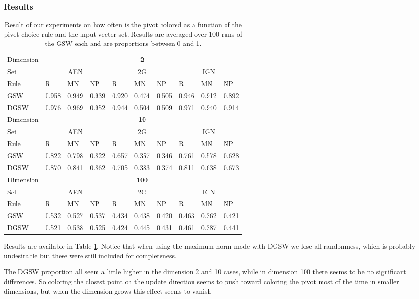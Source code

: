 \documentclass[12pt]{article}
\begin{document}
\subsubsection{Results}
\begin{center}
\begin{table}[h]
\begin{tabular}{l|lll|lll|lll}
Dimension &\multicolumn{9}{c}{\textbf{2}}\\
Set  & \multicolumn{3}{c}{AEN} & \multicolumn{3}{c}{2G} & \multicolumn{3}{c}{IGN} \\
Rule &R&MN&NP&R&MN&NP&R&MN&NP\\ \hline
GSW  &0.958&0.949&0.939&0.920&0.474&0.505&0.946&0.912&0.892\\
DGSW  &0.976&0.969&0.952&0.944&0.504&0.509&0.971&0.940&0.914\\
\hline
\hline
Dimension &\multicolumn{9}{c}{\textbf{10}}\\
Set  & \multicolumn{3}{c}{AEN} & \multicolumn{3}{c}{2G} & \multicolumn{3}{c}{IGN} \\
Rule &R&MN&NP&R&MN&NP&R&MN&NP\\ \hline
GSW  &0.822&0.798&0.822&0.657&0.357&0.346&0.761&0.578&0.628 \\
DGSW  &0.870&0.841&0.862&0.705&0.383&0.374&0.811&0.638&0.673\\
\hline
\hline
Dimension &\multicolumn{9}{c}{\textbf{100}}\\
Set  & \multicolumn{3}{c}{AEN} & \multicolumn{3}{c}{2G} & \multicolumn{3}{c}{IGN} \\
Rule &R&MN&NP&R&MN&NP&R&MN&NP\\ \hline
GSW  &0.532&0.527&0.537&0.434&0.438&0.420&0.463&0.362&0.421 \\
DGSW  &0.521&0.538&0.525&0.424&0.445&0.431&0.461&0.387&0.441\\
\end{tabular}
\caption{Result of our experiments on how often is the pivot colored as a function of the pivot choice rule and the input vector set. Results are averaged over 100 runs of the GSW each and are proportions between 0 and 1.}
\label{pivot_colored_results}
\end{table}
\end{center}
Results are available in Table \ref{pivot_colored_results}. Notice that when using the maximum norm mode with DGSW we lose all randomness, which is probably undesirable but these were still included for completeness.

The DGSW proportion all seem a little higher in the dimension 2 and 10 cases, while in dimension 100 there seems to be no significant differences. So coloring the closest point on the update direction seems to push toward coloring the pivot most of the time in smaller dimensions, but when the dimension grows this effect seems to vanish
\end{document}
